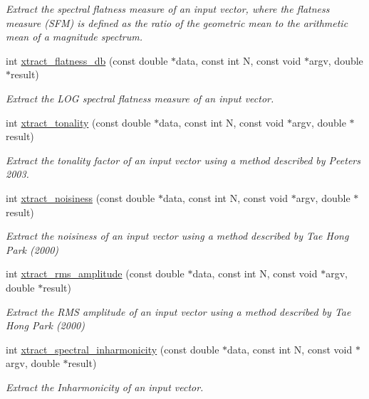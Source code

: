 \begin{DoxyCompactItemize}
\begin{DoxyCompactList}\small\item\em Extract the spectral flatness measure of an input vector, where the flatness measure (S\-F\-M) is defined as the ratio of the geometric mean to the arithmetic mean of a magnitude spectrum. \end{DoxyCompactList}\item 
int \hyperlink{group__scalar_ga19c5211c4e1fe5eeb155069fe0db41c4}{xtract\-\_\-flatness\-\_\-db} (const double $\ast$data, const int N, const void $\ast$argv, double $\ast$result)
\begin{DoxyCompactList}\small\item\em Extract the L\-O\-G spectral flatness measure of an input vector. \end{DoxyCompactList}\item 
int \hyperlink{group__scalar_ga6c051772cad68847b4b57dd3167b72c6}{xtract\-\_\-tonality} (const double $\ast$data, const int N, const void $\ast$argv, double $\ast$result)
\begin{DoxyCompactList}\small\item\em Extract the tonality factor of an input vector using a method described by Peeters 2003. \end{DoxyCompactList}\item 
int \hyperlink{group__scalar_ga9038180c14aff34528ab0c4089ae4218}{xtract\-\_\-noisiness} (const double $\ast$data, const int N, const void $\ast$argv, double $\ast$result)
\begin{DoxyCompactList}\small\item\em Extract the noisiness of an input vector using a method described by Tae Hong Park (2000) \end{DoxyCompactList}\item 
int \hyperlink{group__scalar_gad0520fb1a5cadb2f7821af9d992f5228}{xtract\-\_\-rms\-\_\-amplitude} (const double $\ast$data, const int N, const void $\ast$argv, double $\ast$result)
\begin{DoxyCompactList}\small\item\em Extract the R\-M\-S amplitude of an input vector using a method described by Tae Hong Park (2000) \end{DoxyCompactList}\item 
int \hyperlink{group__scalar_ga6384a55be4e80158bbc955388c8046a6}{xtract\-\_\-spectral\-\_\-inharmonicity} (const double $\ast$data, const int N, const void $\ast$argv, double $\ast$result)
\begin{DoxyCompactList}\small\item\em Extract the Inharmonicity of an input vector. \end{DoxyCompactList}\item 

\end{DoxyCompactItemize}
